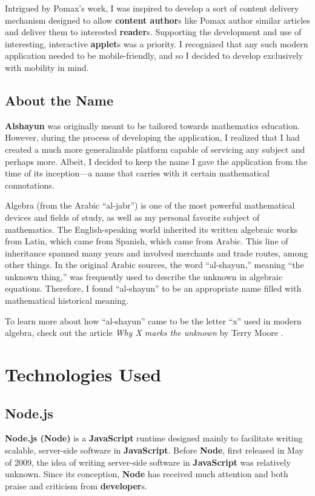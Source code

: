 \documentclass[12pt]{report}
\begin{document}
Intrigued by Pomax's work, I was inspired to develop a sort of content delivery
mechanism designed to allow \textbf{content author}s like Pomax author similar
articles and deliver them to interested \textbf{reader}s. Supporting the
development and use of interesting, interactive \textbf{applet}s was a priority.
I recognized that any such modern application needed to be mobile-friendly, and
so I decided to develop exclusively with mobility in mind.

    \section{About the Name}

\textbf{Alshayun} was originally meant to be tailored towards mathematics
education.  However, during the process of developing the application, I
realized that I had created a much more generalizable platform capable of
servicing any subject and perhaps more. Albeit, I decided to keep the name I
gave the application from the time of its inception---a name that carries with
it certain mathematical connotations.

Algebra (from the Arabic ``al-jabr'') is one of the most powerful mathematical
devices and fields of study, as well as my personal favorite subject of
mathematics. The English-speaking world inherited its written algebraic works
from Latin, which came from Spanish, which came from Arabic. This line of
inheritance spanned many years and involved merchants and trade routes, among
other things. In the original Arabic sources, the word ``al-shayun,'' meaning
``the unknown thing,'' was frequently used to describe the unknown in algebraic
equations. Therefore, I found ``al-shayun'' to be an appropriate name filled
with mathematical historical meaning.

To learn more about how ``al-shayun'' came to be the letter ``x'' used in modern
algebra, check out the article \textit{Why X marks the unknown} by Terry Moore
\cite{moore}.

\chapter{Technologies Used}

    \section{Node.js}

\textbf{Node\@.js (Node)} \cite{nodejs} is a \textbf{JavaScript} runtime
designed mainly to facilitate writing scalable, server-side software in
\textbf{JavaScript}. Before \textbf{Node}, first released in May of 2009, the
idea of writing server-side software in \textbf{JavaScript} was relatively
unknown. Since its conception, \textbf{Node} has received much attention and
both praise and criticism from \textbf{developer}s.
\end{document}
